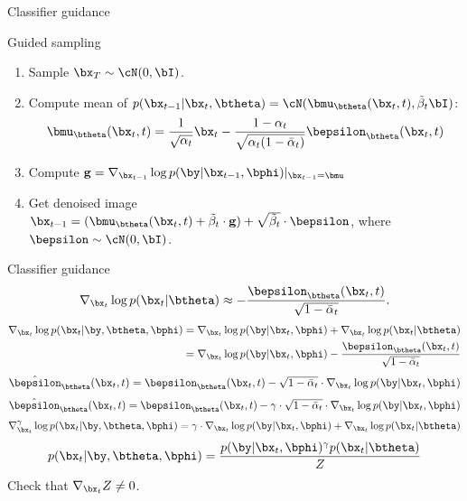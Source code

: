 \begin{frame}{Classifier guidance}
	\begin{block}{Guided sampling}
		\begin{enumerate}
			\item Sample $\bx_T \sim \cN(0, \bI)$.
			\item Compute mean of $p(\bx_{t-1} | \bx_t, \btheta) = \cN(\bmu_{\btheta}(\bx_t, t), \tilde{\beta}_t \bI)$:
			\[
				\bmu_{\btheta}(\bx_t, t) = \frac{1}{\sqrt{\alpha_t}} \bx_t - \frac{1 - \alpha_t}{\sqrt{\alpha_t (1 - \bar{\alpha}_t)}} \bepsilon_{\btheta}(\bx_t, t)
			\]
			\vspace{-0.3cm}
			\item Compute $\mathbf{g} =  \nabla_{\bx_{t-1}} \log p(\by | \bx_{t-1}, \bphi) |_{\bx_{t-1} = \bmu}$
			\item Get denoised image $\bx_{t - 1} = (\bmu_{\btheta}(\bx_t, t) + \tilde{\beta}_t \cdot \mathbf{g})+ \sqrt{\tilde{\beta}_t} \cdot \bepsilon$, where $\bepsilon \sim \cN(0, \bI)$.
		\end{enumerate}
	\end{block}
\end{frame}
\begin{frame}{Classifier guidance}
	\[
		\nabla_{\bx_t} \log p(\bx_t | \btheta) \approx - \frac{\bepsilon_{\btheta}(\bx_t, t)}{\sqrt{1 - \bar{\alpha}_t}}.
	\]
	\begin{align*}
		\nabla_{\bx_t} \log p(\bx_t | \by, \btheta, \bphi) &= \nabla_{\bx_t} \log p(\by | \bx_t, \bphi) + \nabla_{\bx_t} \log p(\bx_t | \btheta) \\
		&= \nabla_{\bx_t} \log p(\by | \bx_t, \bphi) - \frac{\bepsilon_{\btheta}(\bx_t, t)}{\sqrt{1 - \bar{\alpha}_t}}
	\end{align*}
	\[
		\hat{\bepsilon}_{\btheta}(\bx_t, t) = \bepsilon_{\btheta}(\bx_t, t) - \sqrt{1 - \bar{\alpha}_t} \cdot \nabla_{\bx_t} \log p(\by | \bx_t, \bphi)
	\]
	\[
		\hat{\bepsilon}_{\btheta}(\bx_t, t) = \bepsilon_{\btheta}(\bx_t, t) - \gamma \cdot \sqrt{1 - \bar{\alpha}_t} \cdot \nabla_{\bx_t} \log p(\by | \bx_t, \bphi)
	\]
	\[
		\nabla_{\bx_t}^{\gamma} \log p(\bx_t | \by, \btheta, \bphi) = \gamma \cdot \nabla_{\bx_t} \log p(\by | \bx_t, \bphi) + \nabla_{\bx_t} \log p(\bx_t | \btheta) 
	\]
	\[
		p(\bx_t | \by, \btheta, \bphi) = \frac{p(\by | \bx_t, \bphi)^{\gamma} p(\bx_t | \btheta)}{Z}
	\]
	Check that $\nabla_{\bx_t} Z \neq 0$.
\end{frame}
